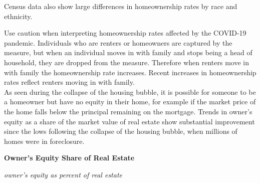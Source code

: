 \documentclass{report}
\makeatletter
\newcommand*\short[1]{\expandafter\@gobbletwo\number\numexpr#1\relax}
\newcommand{\shdateaxisticks}{
		date coordinates in=x, axis line style={draw=none},
		xmax={2020-11-15},
		max space between ticks=40,	    
		xtick={{1990-01-01}, {1995-01-01}, {2000-01-01}, 
			{2005-01-01}, {2010-01-01}, {2015-01-01}, {2020-01-01}},
		minor xtick={},
		enlarge y limits={0.06}, enlarge x limits={0.01},
		}
\newcommand{\stdline}[4]{\addplot[very thick, no markers, color=#1] 
		table [x=#2, y=#3, col sep=comma] {#4};	}
\newcommand{\rbars}{
		\fill[color=black!10] (axis cs:{1990-07-01},\pgfkeysvalueof{/pgfplots/ymin}) rectangle 
			(axis cs:{1991-03-01}, \pgfkeysvalueof{/pgfplots/ymax});
		\fill[color=black!10] (axis cs:{2007-12-01},\pgfkeysvalueof{/pgfplots/ymin}) rectangle 
			(axis cs:{2009-07-01}, \pgfkeysvalueof{/pgfplots/ymax});
		\fill[color=black!10] (axis cs:{2001-03-01},\pgfkeysvalueof{/pgfplots/ymin}) rectangle 
			(axis cs:{2001-11-01}, \pgfkeysvalueof{/pgfplots/ymax});
		\fill[color=black!10] (axis cs:{2020-02-01},\pgfkeysvalueof{/pgfplots/ymin}) rectangle 
			(axis cs:{2020-10-01}, \pgfkeysvalueof{/pgfplots/ymax});}
\makeatother
\begin{document}
{{{\begin{minipage}{0.405\textwidth}
\end{minipage}\hspace{5.5mm}
\begin{minipage}{0.315\textwidth}
\small Census data also show large differences in homeownership rates by race and ethnicity.  \\


\end{minipage}\hspace{5mm}

\vspace{3mm}

\begin{minipage}{0.76\textwidth}
\small Use caution when interpreting homeownership rates affected by the COVID-19 pandemic. Individuals who are renters or homeowners are captured by the measure, but when an individual moves in with family and stops being a head of household, they are dropped from the measure. Therefore when renters move in with family the homeownership rate increases. Recent increases in homeownership rates reflect renters moving in with family. \\

As seen during the collapse of the housing bubble, it is possible for someone to be a homeowner but have no equity in their home, for example if the market price of the home falls below the principal remaining on the mortgage. Trends in owner's equity as a share of the market value of real estate show substantial improvement since the lows following the collapse of the housing bubble, when millions of homes were in foreclosure. 
\end{minipage}

\vspace{2mm}

\begin{minipage}{0.29\textwidth}
\small 
\end{minipage}\hspace{7mm}
\begin{minipage}{0.46\textwidth}
\normalsize \textbf{Owner's Equity Share of Real Estate}

\footnotesize{\textit{owner's equity as percent of real estate}}

\hspace*{-2mm} 


\end{minipage}}}}
\end{document}
